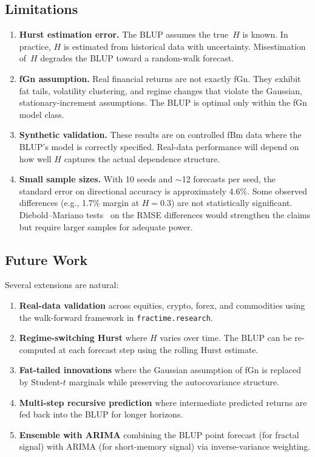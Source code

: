 \documentclass[12pt,a4paper]{article}
\begin{document}
\subsection{Limitations}

\begin{enumerate}
  \item \textbf{Hurst estimation error.}  The BLUP assumes the true~$H$
        is known.  In practice, $H$ is estimated from historical data with
        uncertainty.  Misestimation of~$H$ degrades the BLUP toward a
        random-walk forecast.
  \item \textbf{fGn assumption.}  Real financial returns are not exactly
        fGn.  They exhibit fat tails, volatility clustering, and regime
        changes that violate the Gaussian, stationary-increment
        assumptions.  The BLUP is optimal only within the fGn model class.
  \item \textbf{Synthetic validation.}  These results are on controlled
        fBm data where the BLUP's model is correctly specified.  Real-data
        performance will depend on how well $H$ captures the actual
        dependence structure.
  \item \textbf{Small sample sizes.}  With 10 seeds and $\sim$12 forecasts
        per seed, the standard error on directional accuracy is
        approximately 4.6\%.  Some observed differences (e.g., 1.7\% margin
        at $H = 0.3$) are not statistically significant.
        Diebold--Mariano tests~\citep{DieboldMariano1995} on the RMSE
        differences would strengthen the claims but require larger samples
        for adequate power.
\end{enumerate}

\subsection{Future Work}

Several extensions are natural:

\begin{enumerate}
  \item \textbf{Real-data validation} across equities, crypto, forex,
        and commodities using the walk-forward framework in
        \texttt{fractime.research}.
  \item \textbf{Regime-switching Hurst} where $H$ varies over time.
        The BLUP can be re-computed at each forecast step using the
        rolling Hurst estimate.
  \item \textbf{Fat-tailed innovations} where the Gaussian assumption
        of fGn is replaced by Student-$t$ marginals while preserving
        the autocovariance structure.
  \item \textbf{Multi-step recursive prediction} where intermediate
        predicted returns are fed back into the BLUP for longer horizons.
  \item \textbf{Ensemble with ARIMA} combining the BLUP point forecast
        (for fractal signal) with ARIMA (for short-memory signal) via
        inverse-variance weighting.
\end{enumerate}
\end{document}
